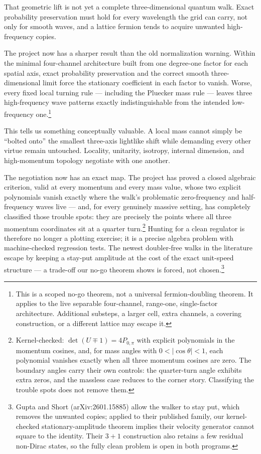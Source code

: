 \documentclass[11pt]{article}
\begin{document}
That geometric lift is not yet a complete three-dimensional quantum walk.
Exact probability preservation must hold for every wavelength the grid can
carry, not only for smooth waves, and a lattice fermion tends to acquire
unwanted high-frequency copies.

The project now has a sharper result than the old normalization warning.
Within the minimal four-channel architecture built from one degree-one factor
for each spatial axis, exact probability preservation and the correct smooth
three-dimensional limit
force the stationary coefficient in each factor to vanish.  Worse, every
fixed local turning rule --- including the Pluecker mass rule --- leaves three
high-frequency wave patterns exactly indistinguishable from the intended
low-frequency one.\footnote{This is
a scoped no-go theorem, not a universal fermion-doubling theorem.  It applies
to the live separable four-channel, range-one, single-factor architecture.
Additional substeps, a larger cell, extra channels, a covering construction,
or a different lattice may escape it.}

This tells us something conceptually valuable.  A local mass cannot simply be
``bolted onto'' the smallest three-axis lightlike shift while demanding every
other virtue remain untouched.  Locality, unitarity, isotropy, internal
dimension, and high-momentum topology negotiate with one another.

The negotiation now has an exact map.  The project has proved a closed
algebraic criterion, valid at every momentum and every mass value, whose two
explicit polynomials vanish exactly where the walk's problematic
zero-frequency and half-frequency waves live --- and, for every genuinely
massive setting, has completely classified those trouble spots: they are
precisely the points where all three momentum coordinates sit at a quarter
turn.\footnote{Kernel-checked: $\det(U\mp1)=4P_{0,\pi}$ with explicit
polynomials in the momentum cosines, and, for mass angles with
$0<|\cos\theta|<1$, each polynomial vanishes exactly when all three momentum
cosines are zero.  The boundary angles carry their own controls: the quarter-turn
angle exhibits extra zeros, and the massless case reduces to the corner
story.  Classifying the trouble spots does not remove them.}  Hunting for
a clean regulator is therefore no longer a plotting exercise; it is a precise
algebra problem with machine-checked regression tests.  The newest
doubler-free walks in the literature escape by keeping a stay-put amplitude
at the cost of the exact unit-speed structure --- a trade-off our no-go
theorem shows is forced, not chosen.\footnote{Gupta and Short
(arXiv:2601.15885) allow the walker to stay put, which removes the unwanted
copies; applied to their published family, our kernel-checked
stationary-amplitude theorem implies their velocity generator cannot square
to the identity.  Their $3+1$ construction also retains a few residual
non-Dirac states, so the fully clean problem is open in both programs.}
\end{document}
